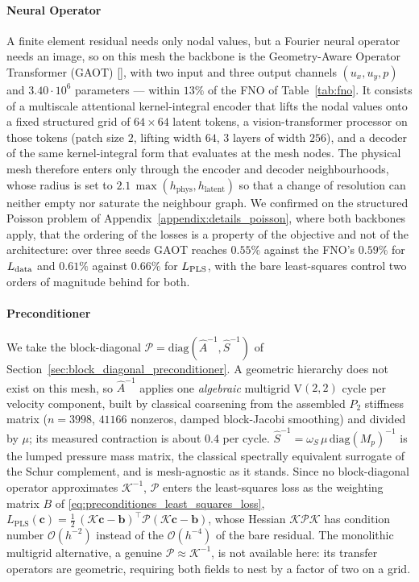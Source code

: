 \documentclass{article} %
\begin{document}
\paragraph{Neural Operator} A finite element residual needs only nodal values, but a Fourier neural operator needs an image, so on this mesh the backbone is the Geometry-Aware Operator Transformer (GAOT) [], with two input and three output channels $(u_x, u_y, p)$ and $3.40\cdot 10^{6}$ parameters --- within $13\%$ of the FNO of Table~\ref{tab:fno}. It consists of a multiscale attentional kernel-integral encoder that lifts the nodal values onto a fixed structured grid of $64\times 64$ latent tokens, a vision-transformer processor on those tokens (patch size $2$, lifting width $64$, $3$ layers of width $256$), and a decoder of the same kernel-integral form that evaluates at the mesh nodes. The physical mesh therefore enters only through the encoder and decoder neighbourhoods, whose radius is set to $2.1\,\max(h_{\mathrm{phys}}, h_{\mathrm{latent}})$ so that a change of resolution can neither empty nor saturate the neighbour graph. We confirmed on the structured Poisson problem of Appendix~\ref{appendix:details_poisson}, where both backbones apply, that the ordering of the losses is a property of the objective and not of the architecture: over three seeds GAOT reaches $0.55\%$ against the FNO's $0.59\%$ for $L_\textup{data}$ and $0.61\%$ against $0.66\%$ for $L_\textup{PLS}$, with the bare least-squares control two orders of magnitude behind for both.

\paragraph{Preconditioner} We take the block-diagonal $\mathcal P = \mathrm{diag}(\hat A^{-1}, \hat S^{-1})$ of Section~\ref{sec:block_diagonal_preconditioner}. A geometric hierarchy does not exist on this mesh, so $\hat A^{-1}$ applies one \emph{algebraic} multigrid V$(2,2)$ cycle per velocity component, built by classical coarsening from the assembled $P_2$ stiffness matrix ($n = 3998$, $41166$ nonzeros, damped block-Jacobi smoothing) and divided by $\mu$; its measured contraction is about $0.4$ per cycle. $\hat S^{-1} = \omega_S\,\mu\,\mathrm{diag}(M_p)^{-1}$ is the lumped pressure mass matrix, the classical spectrally equivalent surrogate of the Schur complement, and is mesh-agnostic as it stands. Since no block-diagonal operator approximates $\mathcal K^{-1}$, $\mathcal P$ enters the least-squares loss as the weighting matrix $B$ of \eqref{eq:preconditiones_least_squares_loss}, $L_{\mathrm{PLS}}(\mathbf c) = \tfrac12\, (\mathcal K \mathbf c - \mathbf b)^\top \mathcal P (\mathcal K \mathbf c - \mathbf b)$, whose Hessian $\mathcal K \mathcal P \mathcal K$ has condition number $\mathcal O(h^{-2})$ instead of the $\mathcal O(h^{-4})$ of the bare residual. The monolithic multigrid alternative, a genuine $\mathcal P \approx \mathcal K^{-1}$, is not available here: its transfer operators are geometric, requiring both fields to nest by a factor of two on a grid.
\end{document}
